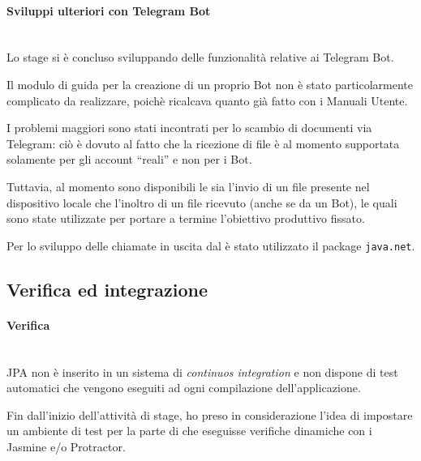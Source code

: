 \paragraph{Sviluppi ulteriori con Telegram Bot} \mbox{} \\

Lo stage si è concluso sviluppando delle funzionalità relative ai Telegram Bot.

Il modulo di guida per la creazione di un proprio Bot non è stato
particolarmente complicato da realizzare, poichè ricalcava quanto già fatto
con i Manuali Utente.

I problemi maggiori sono stati incontrati per lo scambio di documenti via
Telegram: ciò è dovuto al fatto che la ricezione di file è al momento
supportata solamente per gli account ``reali'' e non per i Bot.

Tuttavia, al momento sono disponibili le  sia l'invio di un file
presente nel dispositivo locale che l'inoltro di un file ricevuto (anche se da
un Bot), le quali sono state utilizzate per portare a termine l'obiettivo
produttivo fissato.

Per lo sviluppo delle chiamate  in uscita dal \BKEND{} è stato
utilizzato il package \texttt{java.net}.


\subsection{Verifica ed integrazione}\label{sec:prog-verifica}

\paragraph{Verifica} \mbox{} \\

JPA non è inserito in un sistema di \emph{continuos integration} e non dispone
di test automatici che vengono eseguiti ad ogni compilazione dell'applicazione.

Fin dall'inizio dell'attività di stage, ho preso in considerazione l'idea di
impostare un ambiente di test per la parte di \FREND{} che eseguisse verifiche
dinamiche con i  Jasmine e/o Protractor.


